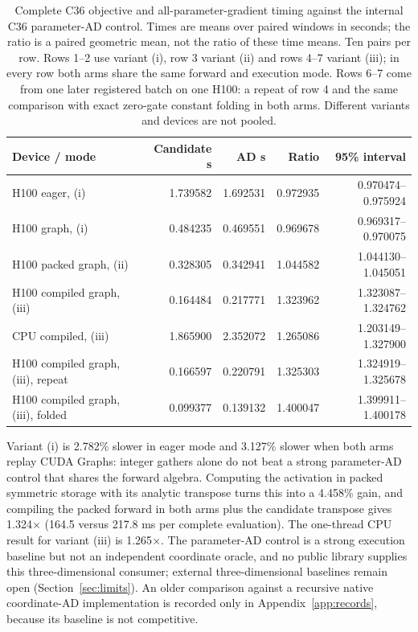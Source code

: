\documentclass[11pt]{article}
\begin{document}
\begin{table}[htbp]\centering\small
\setlength{\tabcolsep}{4pt}
\caption{Complete C36 objective and all-parameter-gradient timing against the internal C36 parameter-AD control. Times are means over paired windows in seconds; the ratio is a paired geometric mean, not the ratio of these time means. Ten pairs per row. Rows 1--2 use variant (i), row 3 variant (ii) and rows 4--7 variant (iii); in every row both arms share the same forward and execution mode. Rows 6--7 come from one later registered batch on one H100: a repeat of row 4 and the same comparison with exact zero-gate constant folding in both arms. Different variants and devices are not pooled.}
\label{tab:c36performance}
\begin{tabular}{lrrrr}\toprule
Device / mode & Candidate s & AD s & Ratio & 95\% interval\\\midrule
H100 eager, (i) & 1.739582 & 1.692531 & 0.972935 & 0.970474--0.975924\\
H100 graph, (i) & 0.484235 & 0.469551 & 0.969678 & 0.969317--0.970075\\
H100 packed graph, (ii) & 0.328305 & 0.342941 & 1.044582 & 1.044130--1.045051\\
H100 compiled graph, (iii) & 0.164484 & 0.217771 & 1.323962 & 1.323087--1.324762\\
CPU compiled, (iii) & 1.865900 & 2.352072 & 1.265086 & 1.203149--1.327900\\
H100 compiled graph, (iii), repeat & 0.166597 & 0.220791 & 1.325303 & 1.324919--1.325678\\
H100 compiled graph, (iii), folded & 0.099377 & 0.139132 & 1.400047 & 1.399911--1.400178
\\\bottomrule\end{tabular}
\end{table}

Variant (i) is 2.782\% slower in eager mode and 3.127\% slower when both
arms replay CUDA Graphs: integer gathers alone do not beat a strong
parameter-AD control that shares the forward algebra. Computing the
activation in packed symmetric storage with its analytic transpose turns
this into a 4.458\% gain, and compiling the packed forward in both arms
plus the candidate transpose gives 1.324$\times$ (164.5 versus 217.8 ms
per complete evaluation). The one-thread CPU result for variant (iii) is
1.265$\times$. The parameter-AD control is a strong execution baseline but
not an independent coordinate oracle, and no public library supplies this
three-dimensional consumer; external three-dimensional baselines remain
open (Section~\ref{sec:limits}). An older comparison against a recursive
native coordinate-AD implementation is recorded only in
Appendix~\ref{app:records}, because its baseline is not competitive.
\end{document}
